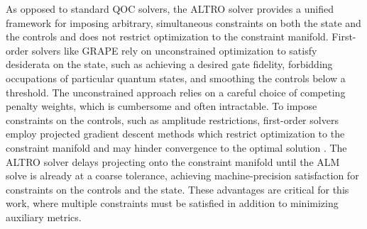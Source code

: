 As opposed to standard QOC solvers, the ALTRO solver provides a unified framework
for imposing arbitrary, simultaneous constraints
on both the state and the controls and does not restrict
optimization to the constraint manifold. First-order solvers like GRAPE
rely on unconstrained optimization to satisfy desiderata on the state,
such as achieving a desired gate fidelity, forbidding occupations of particular quantum states,
and smoothing the controls below a threshold. The unconstrained approach relies
on a careful choice of competing penalty weights, which is cumbersome and often intractable.
To impose constraints on the controls, such as amplitude restrictions, first-order solvers
employ projected gradient descent methods which restrict optimization to the constraint manifold and
may hinder convergence to the optimal solution \cite{clarkson2010coresets,
  hauswirth2016projected}.
The ALTRO solver delays projecting onto the constraint manifold until the ALM
solve is already at a coarse tolerance, achieving machine-precision satisfaction
for constraints on the controls and the state. These advantages are critical
for this work, where multiple constraints must be satisfied in addition
to minimizing auxiliary metrics.


